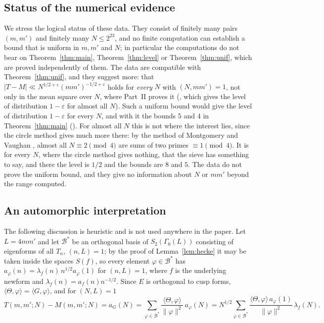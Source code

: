 \documentclass[11pt]{amsart}
\theoremstyle{remark}
\newcommand{\e}{\varepsilon}
\begin{document}
\subsection{Status of the numerical evidence}
We stress the logical status of these data. They consist of finitely many pairs $(m,m')$ and finitely many $N\le 2^{23}$, and no finite computation can establish a bound that is uniform in $m,m'$ and $N$; in particular the computations do not bear on Theorem~\ref{thm:main}, Theorem~\ref{thm:level} or Theorem~\ref{thm:unif}, which are proved independently of them. The data are compatible with Theorem~\ref{thm:unif}, and they suggest more: that $|T-M|\ll N^{1/2+\e}(mm')^{-1/2+\e}$ holds for \emph{every} $N$ with $(N,mm')=1$, not only in the mean square over $N$, where Part~II proves it (\cite[Theorem~1.2]{ChenII}, which gives the level of distribution $1-\e$ for almost all $N$). Such a uniform bound would give the level of distribution $1-\e$ for every $N$, and with it the bounds $5$ and $4$ in Theorem~\ref{thm:main} (\cite[Section~4]{ChenII}). For almost all $N$ this is not where the interest lies, since the circle method gives much more there: by the method of Montgomery and Vaughan \cite{MV}, almost all $N\equiv2\pmod 4$ are sums of two primes $\equiv1\pmod4$. It is for every $N$, where the circle method gives nothing, that the sieve has something to say, and there the level is $1/2$ and the bounds are $8$ and $5$. The data do not prove the uniform bound, and they give no information about $N$ or $mm'$ beyond the range computed.

\subsection{An automorphic interpretation}\label{subsec:auto}
The following discussion is heuristic and is not used anywhere in the paper. Let $L=4mm'$ and let $\mathcal B^*$ be an orthogonal basis of $S_2(\Gamma_0(L))$ consisting of eigenforms of all $T_n$, $(n,L)=1$; by the proof of Lemma~\ref{lem:hecke} it may be taken inside the spaces $S(f)$, so every element $\varphi\in\mathcal B^*$ has $a_\varphi(n)=\lambda_f(n)\,n^{1/2}a_\varphi(1)$ for $(n,L)=1$, where $f$ is the underlying newform and $\lambda_f(n)=a_f(n)n^{-1/2}$. Since $E$ is orthogonal to cusp forms, $\langle\Theta,\varphi\rangle=\langle G,\varphi\rangle$, and for $(N,L)=1$
\begin{equation}\label{eq:spectral}
T(m,m';N)-M(m,m';N)=a_G(N)=\sum_{\varphi\in\mathcal B^*}\frac{\langle\Theta,\varphi\rangle}{\|\varphi\|^2}\,a_\varphi(N)
=N^{1/2}\sum_{\varphi\in\mathcal B^*}\frac{\langle\Theta,\varphi\rangle\,a_\varphi(1)}{\|\varphi\|^2}\,\lambda_f(N).
\end{equation}
\end{document}

